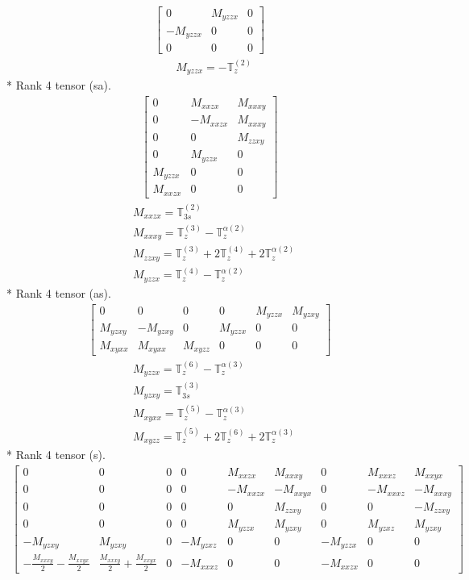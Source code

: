 \documentclass[fleqn,8pt,landscape]{jsarticle}
\begin{document}
\begin{align*}
\begin{bmatrix} 0 & M_{yzzx} & 0 \\ - M_{yzzx} & 0 & 0 \\ 0 & 0 & 0 \end{bmatrix}
\end{align*}
\begin{align*}
& M_{yzzx} = - \mathbb{T}_{z}^{(2)}
\end{align*}
* Rank 4 tensor (sa).
\begin{align*}
\begin{bmatrix} 0 & M_{xxzx} & M_{xxxy} \\ 0 & - M_{xxzx} & M_{xxxy} \\ 0 & 0 & M_{zzxy} \\ 0 & M_{yzzx} & 0 \\ M_{yzzx} & 0 & 0 \\ M_{xxzx} & 0 & 0 \end{bmatrix}
\end{align*}
\begin{align*}
& M_{xxzx} = \mathbb{T}_{3s}^{(2)} \\
& M_{xxxy} = \mathbb{T}_{z}^{(3)} - \mathbb{T}_{z}^{\alpha(2)} \\
& M_{zzxy} = \mathbb{T}_{z}^{(3)} + 2 \mathbb{T}_{z}^{(4)} + 2 \mathbb{T}_{z}^{\alpha(2)} \\
& M_{yzzx} = \mathbb{T}_{z}^{(4)} - \mathbb{T}_{z}^{\alpha(2)}
\end{align*}
* Rank 4 tensor (as).
\begin{align*}
\begin{bmatrix} 0 & 0 & 0 & 0 & M_{yzzx} & M_{yzxy} \\ M_{yzxy} & - M_{yzxy} & 0 & M_{yzzx} & 0 & 0 \\ M_{xyxx} & M_{xyxx} & M_{xyzz} & 0 & 0 & 0 \end{bmatrix}
\end{align*}
\begin{align*}
& M_{yzzx} = \mathbb{T}_{z}^{(6)} - \mathbb{T}_{z}^{\alpha(3)} \\
& M_{yzxy} = \mathbb{T}_{3s}^{(3)} \\
& M_{xyxx} = \mathbb{T}_{z}^{(5)} - \mathbb{T}_{z}^{\alpha(3)} \\
& M_{xyzz} = \mathbb{T}_{z}^{(5)} + 2 \mathbb{T}_{z}^{(6)} + 2 \mathbb{T}_{z}^{\alpha(3)}
\end{align*}
* Rank 4 tensor (s).
\begin{align*}
\begin{bmatrix} 0 & 0 & 0 & 0 & M_{xxzx} & M_{xxxy} & 0 & M_{xxxz} & M_{xxyx} \\ 0 & 0 & 0 & 0 & - M_{xxzx} & - M_{xxyx} & 0 & - M_{xxxz} & - M_{xxxy} \\ 0 & 0 & 0 & 0 & 0 & M_{zzxy} & 0 & 0 & - M_{zzxy} \\ 0 & 0 & 0 & 0 & M_{yzzx} & M_{yzxy} & 0 & M_{yzxz} & M_{yzxy} \\ - M_{yzxy} & M_{yzxy} & 0 & - M_{yzxz} & 0 & 0 & - M_{yzzx} & 0 & 0 \\ - \frac{M_{xxxy}}{2} - \frac{M_{xxyx}}{2} & \frac{M_{xxxy}}{2} + \frac{M_{xxyx}}{2} & 0 & - M_{xxxz} & 0 & 0 & - M_{xxzx} & 0 & 0 \end{bmatrix}
\end{align*}
\end{document}

